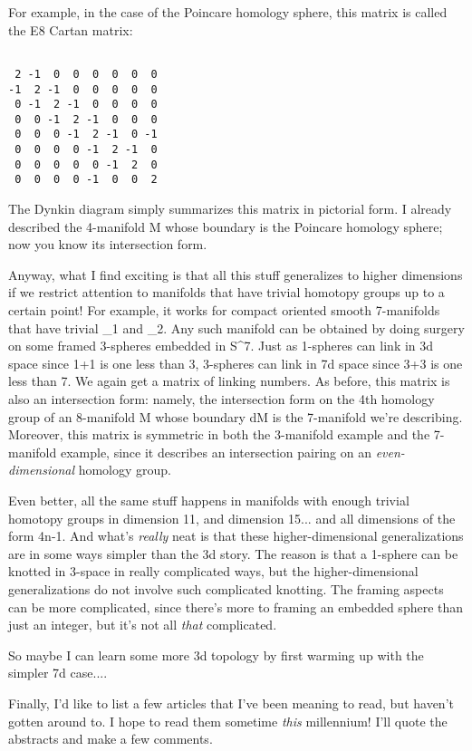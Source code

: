 For example, in the case of the Poincare homology sphere, this matrix 
is called the E8 Cartan matrix:


\begin{verbatim}

 2 -1  0  0  0  0  0  0
-1  2 -1  0  0  0  0  0 
 0 -1  2 -1  0  0  0  0 
 0  0 -1  2 -1  0  0  0 
 0  0  0 -1  2 -1  0 -1
 0  0  0  0 -1  2 -1  0
 0  0  0  0  0 -1  2  0 
 0  0  0  0 -1  0  0  2
\end{verbatim}
    
The Dynkin diagram simply summarizes this matrix in pictorial form.  
I already described the 4-manifold M whose boundary is the Poincare
homology sphere; now you know its intersection form. 

Anyway, what I find exciting is that all this stuff generalizes to
higher dimensions if we restrict attention to manifolds that have
trivial homotopy groups up to a certain point!  For example, it works
for compact oriented smooth 7-manifolds that have trivial \pi _{1}
and \pi _{2}.  Any such manifold can be obtained by doing surgery
on some framed 3-spheres embedded in S^{7}.  Just as 1-spheres
can link in 3d space since 1+1 is one less than 3, 3-spheres can link in
7d space since 3+3 is one less than 7.  We again get a matrix of linking
numbers.  As before, this matrix is also an intersection form: namely,
the intersection form on the 4th homology group of an 8-manifold M whose
boundary dM is the 7-manifold we're describing.  Moreover, this matrix
is symmetric in both the 3-manifold example and the 7-manifold example,
since it describes an intersection pairing on an
\emph{even-dimensional} homology group.

Even better, all the same stuff happens in manifolds with enough
trivial homotopy groups in dimension 11, and dimension 15... and 
all dimensions of the form 4n-1.  And what's \emph{really} neat is that 
these higher-dimensional generalizations are in some ways simpler 
than the 3d story.  The reason is that a 1-sphere can be knotted 
in 3-space in really complicated ways, but the higher-dimensional 
generalizations do not involve such complicated knotting.  The 
framing aspects can be more complicated, since there's more to 
framing an embedded sphere than just an integer, but it's not all
\emph{that} complicated. 

So maybe I can learn some more 3d topology by first warming up with
the simpler 7d case....

Finally, I'd like to list a few articles that I've been meaning to
read, but haven't gotten around to.  I hope to read them sometime
\emph{this} millennium!  I'll quote the abstracts and make a few comments.

